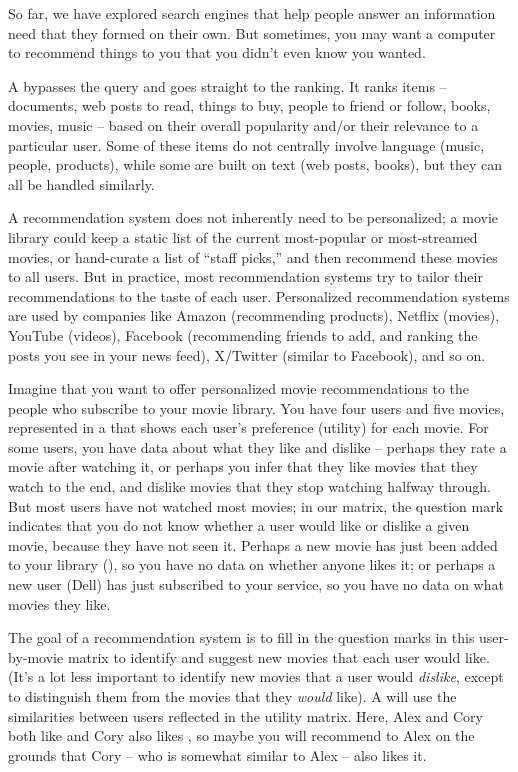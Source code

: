 So far, we have explored search engines that help people answer an information need that they formed on their own.  But sometimes, you may want a computer to recommend things to you that you didn't even know you wanted.

A  bypasses the query and goes straight to the ranking.  It ranks items -- documents, web posts to read, things to buy, people to friend or follow, books, movies, music -- based on their overall popularity and/or their relevance to a particular user.  Some of these items  do not centrally involve  language (music, people, products), while some are built on text (web posts, books), but they can all be handled similarly.   

A recommendation system does not inherently need to be personalized; a movie library could keep a static list of the current most-popular or most-streamed movies, or  hand-curate a list of ``staff picks,'' and then recommend these movies to all users.  But in practice, most recommendation systems try to tailor their recommendations to the taste of each user.  Personalized recommendation systems are used by companies like Amazon (recommending products), Netflix (movies), YouTube (videos), Facebook (recommending friends to add, and ranking the posts you see in your news feed), X/Twitter (similar to Facebook), and so on.

Imagine that you want to offer personalized movie recommendations  to the people who subscribe to your movie library.  You have four users and five movies, represented in a  that shows each user's preference (utility) for each movie.  For some users, you have data about what they like and dislike -- perhaps they rate a movie after watching it, or perhaps you infer that they like movies that they watch to the end, and dislike movies that they stop watching halfway through.  But most users have not watched most movies; in our matrix, the question mark indicates that you do not know whether a user would like or dislike a given movie, because they have not seen it.  Perhaps a new movie has just been added to your library (), so you have no data on whether anyone likes it; or perhaps a new user (Dell) has just subscribed to your service, so you have no data on what movies they like.  

The goal of a recommendation system is to fill in the question marks in this user-by-movie matrix to identify and suggest new movies that each user would like.  (It's a lot less important to identify new movies that a user would \emph{dislike}, except to distinguish them from the movies that they \emph{would} like).   
A  will use the similarities between users reflected in the utility matrix.  Here, Alex and Cory both like  and Cory also likes , so maybe you will recommend  to Alex on the grounds that Cory -- who is somewhat similar to Alex -- also likes it.

